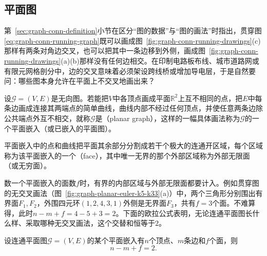 \subsection{平面图}
\label{sec:graph-planar-graphs}

第~\ref{sec:graph-conn-definition}小节在区分“图的数据”与“图的画法”时指出，贯穿图\eqref{eq:graph-conn-running-graph}既可以画成图~\ref{fig:graph-conn-running-drawings}(c)那样有两条对角边交叉，也可以把其中一条边移到外侧，画成图~\ref{fig:graph-conn-running-drawings}(a)(b)那样没有任何边相交。在印制电路板布线、城市道路网或有限元网格剖分中，边的交叉意味着必须架设跨线桥或增加导电层，于是自然要问：哪些图本身允许在平面上不交叉地画出来？

\begin{definition}
\label{def:graph-planar}
设$\mathcal G=(V,E)$是无向图。若能把$V$中各顶点画成平面$\mathbb R^2$上互不相同的点，把$E$中每条边画成连接其两端点的简单曲线，曲线内部不经过任何顶点，并使任意两条边除公共端点外互不相交，就称$\mathcal G$是（planar graph），这样的一幅具体画法称为$\mathcal G$的一个平面嵌入（或已嵌入的平面图）。

平面嵌入中的点和曲线把平面其余部分分割成若干个极大的连通开区域，每个区域称为该平面嵌入的一个（face），其中唯一无界的那个外部区域称为外部无限面（或无穷面）。
\end{definition}

数一个平面嵌入的面数$f$时，有界的内部区域与外部无限面都要计入。例如贯穿图的无交叉画法（图~\ref{fig:graph-planar-euler-k5-k33}(a)）中，两个三角形分别围出有界面$F_1,F_2$，外围四元环$(1,2,4,3,1)$外侧是无界面$F_3$，共有$f=3$个面。不难算得，此时$n-m+f=4-5+3=2$。下面的欧拉公式表明，无论连通平面图长什么样、采取哪种无交叉画法，这个交替和恒等于$2$。

\begin{theorem}[平面图的欧拉公式]
\label{thm:graph-euler-planar}
设连通平面图$\mathcal G=(V,E)$的某个平面嵌入有$n$个顶点、$m$条边和$f$个面，则
\begin{equation}
n - m + f = 2.
\label{eq:graph-euler-planar}
\end{equation}
\end{theorem}

